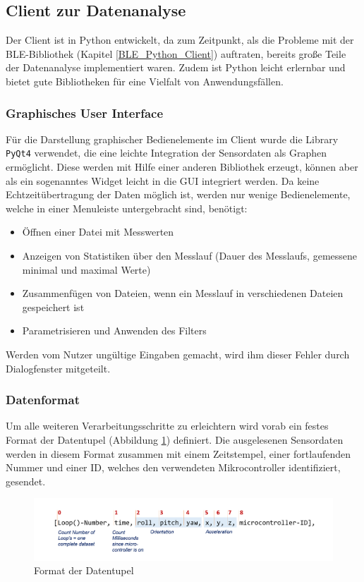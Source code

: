 \subsection{Client zur Datenanalyse}

Der Client ist in Python entwickelt, da zum Zeitpunkt, als die Probleme mit der BLE-Bibliothek (Kapitel \ref{BLE_Python_Client}) auftraten, bereits große Teile der Datenanalyse implementiert waren. Zudem ist Python leicht erlernbar und bietet gute Bibliotheken für eine Vielfalt von Anwendungsfällen.
\subsubsection{Graphisches User Interface}
Für die Darstellung graphischer Bedienelemente im Client wurde die Library \texttt{PyQt4} verwendet, die eine leichte Integration der Sensordaten als Graphen ermöglicht. Diese werden mit Hilfe einer anderen Bibliothek erzeugt, können aber als ein sogenanntes Widget leicht in die GUI integriert werden.
Da keine Echtzeitübertragung der Daten möglich ist, werden nur wenige Bedienelemente, welche in einer Menuleiste untergebracht sind, benötigt:
\begin{itemize}
\item Öffnen einer Datei mit Messwerten
\item Anzeigen von Statistiken über den Messlauf (Dauer des Messlaufs, gemessene minimal und maximal Werte)
\item Zusammenfügen von Dateien, wenn ein Messlauf in verschiedenen Dateien gespeichert ist
\item Parametrisieren und Anwenden des Filters
\end{itemize}
Werden vom Nutzer ungültige Eingaben gemacht, wird ihm dieser Fehler durch Dialogfenster mitgeteilt. 
\subsubsection{Datenformat}
Um alle weiteren Verarbeitungsschritte zu erleichtern wird vorab ein festes Format der Datentupel (Abbildung \ref{fig:k3-datenformat.png}) definiert. Die ausgelesenen Sensordaten werden in diesem Format zusammen mit einem Zeitstempel, einer fortlaufenden Nummer und einer ID, welches den verwendeten Mikrocontroller identifiziert, gesendet.
\begin{figure}[h]
	\centering
	\includegraphics[width=1\textwidth]{images/k3-datenformat.png}
	\caption {Format der Datentupel}
	\label{fig:k3-datenformat.png} 
\end{figure}
